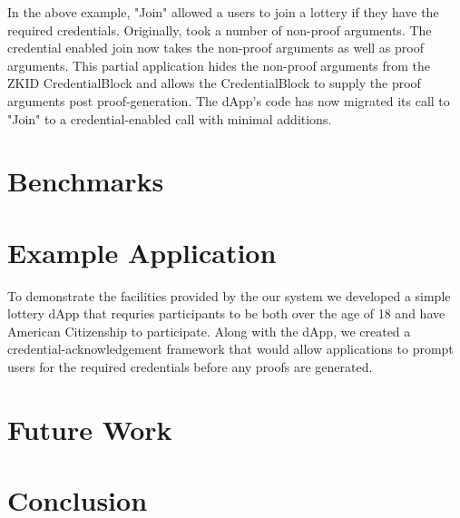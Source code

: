 \documentclass[11 pt]{extarticle}
\theoremstyle{remark}
\begin{document}
In the above example, "Join" allowed a users to join a lottery if they have the required credentials. Originally, took a number of non-proof arguments. 
The credential enabled join now takes the non-proof arguments as well as proof arguments. This partial application hides the non-proof arguments from the ZKID CredentialBlock and allows the CredentialBlock to 
supply the proof arguments post proof-generation. The dApp's code has now migrated its call to "Join" to a credential-enabled call with minimal additions.

\section{Benchmarks}

\section{Example Application}

To demonstrate the facilities provided by the our system we developed a simple lottery dApp that requries participants to be
both over the age of 18 and have American Citizenship to participate. Along with the dApp, we created a credential-acknowledgement
framework that would allow applications to prompt users for the required credentials before any proofs are generated.

\section{Future Work}

\section{Conclusion}



\end{document}
